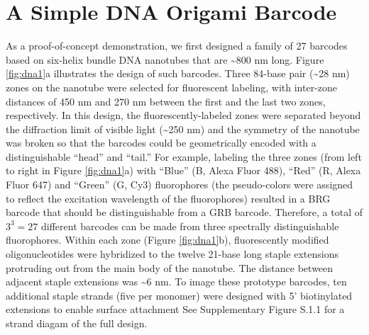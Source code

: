 \section{A Simple DNA Origami Barcode}
As a proof-of-concept demonstration, we first designed a family of 27 barcodes 
based on six-helix bundle DNA nanotubes \citep{douglas_dna-nanotube-induced_2007} that are \textasciitilde800 nm long. Figure \ref{fig:dna1}a illustrates 
the design of such barcodes. Three 84-base pair (\textasciitilde28 nm) zones on the nanotube were 
selected for fluorescent labeling, with inter-zone distances of 450 nm and 270 nm 
between the first and the last two zones, respectively. In this design, the fluorescently-labeled zones were separated beyond the diffraction limit of visible light (\textasciitilde250 nm) and 
the symmetry of the nanotube was broken so that the barcodes could be geometrically 
encoded with a distinguishable ``head'' and ``tail.'' For example, labeling the three zones 
(from left to right in Figure \ref{fig:dna1}a) with ``Blue'' (B, Alexa Fluor 488), ``Red'' (R, Alexa Fluor 
647) and ``Green'' (G, Cy3) fluorophores (the pseudo-colors were assigned to reflect the 
excitation wavelength of the fluorophores) resulted in a BRG barcode that should be 
distinguishable from a GRB barcode. Therefore, a total of $3^{3}=27$ different barcodes can 
be made from three spectrally distinguishable fluorophores. Within each zone (Figure 
\ref{fig:dna1}b), fluorescently modified oligonucleotides were hybridized to the twelve 21-base long 
staple extensions protruding out from the main body of the nanotube. The distance 
between adjacent staple extensions was \textasciitilde6 nm. To image these prototype 
barcodes, ten additional staple strands (five per monomer) 
were designed with 5' biotinylated extensions to enable surface attachment See Supplementary Figure 
S.1.1 for a strand diagam of the full design. 


